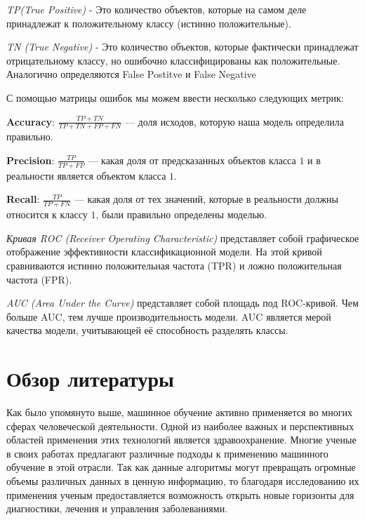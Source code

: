 \documentclass[14pt, a4paper]{extarticle}
\begin{document}
\textit{TP(True Positive)} - Это количество объектов, которые на самом деле принадлежат к положительному классу (истинно положительные).

\textit{TN (True Negative)} - Это количество объектов, которые фактически принадлежат отрицательному классу, но ошибочно классифицированы как положительные.
Аналогично определяются False Postitve и False Negative

\vspace{5mm}

С помощью матрицы ошибок мы можем ввести несколько следующих метрик:

\textbf{Accuracy}: $\frac{TP + TN}{TP + TN + FP + FN}$ — доля исходов, которую наша модель определила правильно.

\vspace{5mm}

\textbf{Precision}: $\frac{TP}{TP + FP}$ — какая доля от предсказанных объектов класса $1$ и в реальности является объектом класса $1$.

\vspace{5mm}

\textbf{Recall}: $\frac{TP}{TP + FN}$ — какая доля от тех значений, которые в  реальности должны относится к классу $1$, были правильно определены моделью.


\textit{Кривая ROC (Receiver Operating Characteristic) }представляет собой графическое отображение эффективности классификационной модели. На этой кривой сравниваются истинно положительная частота (TPR) и ложно положительная частота (FPR).

\textit{AUC (Area Under the Curve)} представляет собой площадь под ROC-кривой. Чем больше AUC, тем лучше производительность модели. AUC является мерой качества модели, учитывающей её способность разделять классы.

\newpage
\section{Обзор литературы}
Как было упомянуто выше, машинное обучение активно применяется во многих сферах человеческой деятельности. Одной из наиболее важных и перспективных областей применения этих технологий является здравоохранение. Многие ученые в своих работах предлагают различные подходы к применению машинного обучение в этой отрасли. Так как данные алгоритмы могут  превращать  огромные объемы различных данных в ценную информацию, то благодаря исследованию их применения ученым предоставляется возможность открыть  новые горизонты для диагностики, лечения и управления заболеваниями.
\end{document}

